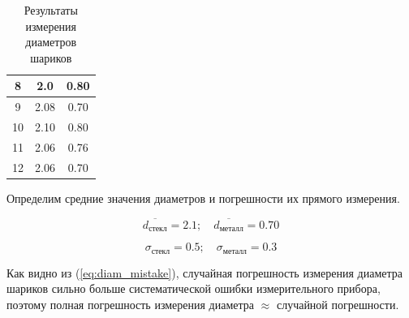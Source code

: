 \documentclass[a4paper, 12pt]{article}%
\begin{document}
\begin{table}[h]
\begin{tabular}{|c|c|c|}
8           & 2.0                                                                        & 0.80                                                                           \\ \hline
9           & 2.08                                                                        & 0.70                                                                           \\ \hline
10          & 2.10                                                                        & 0.80                                                                           \\ \hline
11          & 2.06                                                                        & 0.76                                                                           \\ \hline
12          & 2.06                                                                        & 0.70                                                                           \\ \hline

\end{tabular}
\caption{Результаты измерения диаметров шариков}
\label{tab:results_of_diam_measuring}
\end{table}

Определим средние значения диаметров и погрешности их прямого измерения.

$$\overline{d_{\text{стекл}}}  = 2.1; \quad \overline{d_{\text{металл}}} = 0.70$$\label{eq:average_diam}

$$\sigma_{\text{стекл}} = 0.5;\quad  \sigma_{\text{металл}} = 0.3$$\label{eq:diam_mistake}

Как видно из (\ref{eq:diam_mistake}), случайная погрешность измерения диаметра шариков сильно больше систематической ошибки измерительного прибора, поэтому полная погрешность измерения диаметра $\approx$ случайной погрешности.
\end{document}
